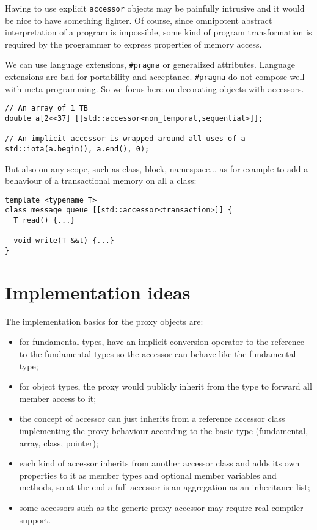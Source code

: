 \documentclass[a4paper]{article}
\begin{document}
Having to use explicit \texttt{accessor} objects may be painfully
intrusive and it would be nice to have something lighter. Of course,
since omnipotent abstract interpretation of a program is impossible,
some kind of program transformation is required by the programmer to
express properties of memory access.

We can use language extensions, \lstinline|#pragma| or generalized
attributes. Language extensions are bad for portability and
acceptance. \lstinline|#pragma| do not compose well with
meta-programming. So we focus here on decorating objects with
accessors.

\begin{lstlisting}
// An array of 1 TB
double a[2<<37] [[std::accessor<non_temporal,sequential>]];

// An implicit accessor is wrapped around all uses of a
std::iota(a.begin(), a.end(), 0);
\end{lstlisting}

But also on any scope, such as class, block, namespace... as for
example to add a behaviour of a transactional memory on all a class:
\begin{lstlisting}
template <typename T>
class message_queue [[std::accessor<transaction>]] {
  T read() {...}

  void write(T &&t) {...}
}
\end{lstlisting}


\section{Implementation ideas}
\label{sec:implementation-ideas}

The implementation basics for the proxy objects are:
\begin{itemize}
\item for fundamental types, have an implicit conversion operator to
  the reference to the fundamental types so the accessor can behave
  like the fundamental type;
\item for object types, the proxy would publicly inherit from the type to
  forward all member access to it;
\item the concept of accessor can just inherits from a reference
  accessor class implementing the proxy behaviour according to the
  basic type (fundamental, array, class, pointer);
\item each kind of accessor inherits from another accessor class and
  adds its own properties to it as member types and optional member
  variables and methods, so at the end a full accessor is an
  aggregation as an inheritance list;
\item some accessors such as the generic proxy accessor may require
  real compiler support.
\end{itemize}
\end{document}
